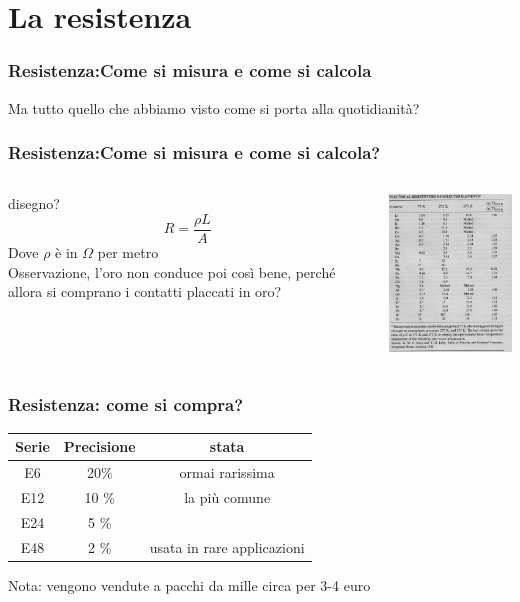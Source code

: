 	\section{La resistenza} %
	\label{sec:la_resistenza}
		\begin{frame}[c]\frametitle{Resistenza:Come si misura e come si calcola}
		    Ma tutto quello che abbiamo visto come si porta alla quotidianità?			
		\end{frame}
		\begin{frame}[c]\frametitle{Resistenza:Come si misura e come si calcola?}
		    \begin{columns}
		    	\begin{column}{0.5\textwidth}
		    	disegno?
		    		\[
		    		 R = \frac{\rho L}{A}
		    		\]
		    		Dove $\rho$ è in $\Omega$ per metro\\
		    		Osservazione, l'oro non conduce poi così bene, perché allora si comprano i contatti placcati in oro?		    		
		    	\end{column}
		    	\begin{column}{0.7\textwidth}
		    		\includegraphics[width=5.5cm]{./img/rho.jpg}
		    	\end{column}
		    \end{columns}	
		\end{frame}

		\begin{frame}[c]\frametitle{Resistenza: come si compra?}
		    \centering
		\begin{tabular}{c|c|c}
		Serie & Precisione & stata \\
		\hline
		E6	& 20\% & ormai rarissima  \\
		E12	& 10 \% & la più comune  \\
		E24	& 5  \% \\
		E48	& 2  \% & usata in rare applicazioni \\
		\end{tabular}
		
		\bigskip
		
		Nota: vengono vendute a pacchi da mille circa per 3-4 euro
		
		\end{frame}


